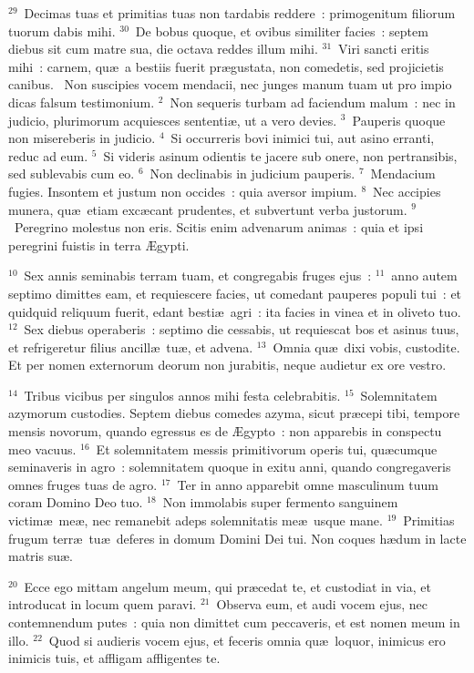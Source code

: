${}^{29}$~Decimas tuas et primitias tuas non tardabis reddere~: primogenitum filiorum tuorum dabis mihi.
${}^{30}$~De bobus quoque, et ovibus similiter facies~: septem diebus sit cum matre sua, die octava reddes illum mihi.
${}^{31}$~Viri sancti eritis mihi~: carnem, qu\ae\ a bestiis fuerit pr\ae gustata, non comedetis, sed projicietis canibus.
~Non suscipies vocem mendacii, nec junges manum tuam ut pro impio dicas falsum testimonium.
${}^{2}$~Non sequeris turbam ad faciendum malum~: nec in judicio, plurimorum acquiesces sententi\ae , ut a vero devies.
${}^{3}$~Pauperis quoque non misereberis in judicio.
${}^{4}$~Si occurreris bovi inimici tui, aut asino erranti, reduc ad eum.
${}^{5}$~Si videris asinum odientis te jacere sub onere, non pertransibis, sed sublevabis cum eo.
${}^{6}$~Non declinabis in judicium pauperis.
${}^{7}$~Mendacium fugies. Insontem et justum non occides~: quia aversor impium.
${}^{8}$~Nec accipies munera, qu\ae\ etiam exc\ae cant prudentes, et subvertunt verba justorum.
${}^{9}$~Peregrino molestus non eris. Scitis enim advenarum animas~: quia et ipsi peregrini fuistis in terra \AE gypti.


${}^{10}$~Sex annis seminabis terram tuam, et congregabis fruges ejus~:
${}^{11}$~anno autem septimo dimittes eam, et requiescere facies, ut comedant pauperes populi tui~: et quidquid reliquum fuerit, edant besti\ae\ agri~: ita facies in vinea et in oliveto tuo.
${}^{12}$~Sex diebus operaberis~: septimo die cessabis, ut requiescat bos et asinus tuus, et refrigeretur filius ancill\ae\ tu\ae , et advena.
${}^{13}$~Omnia qu\ae\ dixi vobis, custodite. Et per nomen externorum deorum non jurabitis, neque audietur ex ore vestro.


${}^{14}$~Tribus vicibus per singulos annos mihi festa celebrabitis.
${}^{15}$~Solemnitatem azymorum custodies. Septem diebus comedes azyma, sicut pr\ae cepi tibi, tempore mensis novorum, quando egressus es de \AE gypto~: non apparebis in conspectu meo vacuus.
${}^{16}$~Et solemnitatem messis primitivorum operis tui, qu\ae cumque seminaveris in agro~: solemnitatem quoque in exitu anni, quando congregaveris omnes fruges tuas de agro.
${}^{17}$~Ter in anno apparebit omne masculinum tuum coram Domino Deo tuo.
${}^{18}$~Non immolabis super fermento sanguinem victim\ae\ me\ae , nec remanebit adeps solemnitatis me\ae\ usque mane.
${}^{19}$~Primitias frugum terr\ae\ tu\ae\ deferes in domum Domini Dei tui. Non coques h\ae dum in lacte matris su\ae .


${}^{20}$~Ecce ego mittam angelum meum, qui pr\ae cedat te, et custodiat in via, et introducat in locum quem paravi.
${}^{21}$~Observa eum, et audi vocem ejus, nec contemnendum putes~: quia non dimittet cum peccaveris, et est nomen meum in illo.
${}^{22}$~Quod si audieris vocem ejus, et feceris omnia qu\ae\ loquor, inimicus ero inimicis tuis, et affligam affligentes te.


